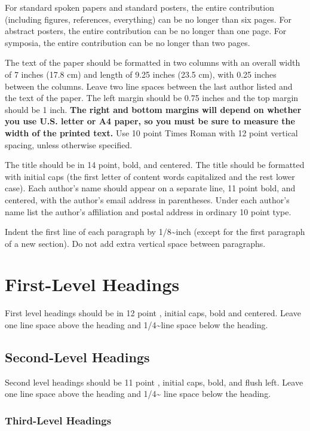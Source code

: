 \documentclass[10pt, letterpaper]{article}
\begin{document}
For standard spoken papers and standard posters, the entire contribution
(including figures, references, everything) can be no longer than six
pages. For abstract posters, the entire contribution can be no longer
than one page. For symposia, the entire contribution can be no longer
than two pages.

The text of the paper should be formatted in two columns with an overall
width of 7 inches (17.8 cm) and length of 9.25 inches (23.5 cm), with
0.25 inches between the columns. Leave two line spaces between the last
author listed and the text of the paper. The left margin should be 0.75
inches and the top margin should be 1 inch.
\textbf{The right and bottom margins will depend on whether you use
U.S. letter or A4 paper, so you must be sure to measure the width of
the printed text.} Use 10 point Times Roman with 12 point vertical
spacing, unless otherwise specified.

The title should be in 14 point, bold, and centered. The title should be
formatted with initial caps (the first letter of content words
capitalized and the rest lower case). Each author's name should appear
on a separate line, 11 point bold, and centered, with the author's email
address in parentheses. Under each author's name list the author's
affiliation and postal address in ordinary 10 point type.

Indent the first line of each paragraph by 1/8\textasciitilde{}inch
(except for the first paragraph of a new section). Do not add extra
vertical space between paragraphs.

\section{First-Level Headings}\label{first-level-headings}

First level headings should be in 12 point , initial caps, bold and
centered. Leave one line space above the heading and
1/4\textasciitilde{}line space below the heading.

\subsection{Second-Level Headings}\label{second-level-headings}

Second level headings should be 11 point , initial caps, bold, and flush
left. Leave one line space above the heading and 1/4\textasciitilde{}
line space below the heading.

\subsubsection{Third-Level Headings}\label{third-level-headings}
\end{document}
